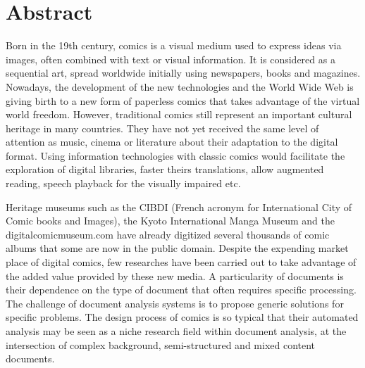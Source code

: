 \chapter*{Abstract}


Born in the 19th century, comics is a visual medium used to express ideas via images, often combined with text or visual information.
It is considered as a sequential art, spread worldwide initially using newspapers, books and magazines.
Nowadays, the development of the new technologies and the World Wide Web is giving birth to a new form of paperless comics that takes advantage of the virtual world freedom.
However, traditional comics still represent an important cultural heritage in many countries.
They have not yet received the same level of attention as music, cinema or literature about their adaptation to the digital format.
Using information technologies with classic comics would facilitate the exploration of digital libraries, faster theirs translations, allow augmented reading, speech playback for the visually impaired etc.

Heritage museums such as the CIBDI (French acronym for International City of Comic books and Images), the Kyoto International Manga Museum and the digitalcomicmuseum.com have already digitized several thousands of comic albums that some are now in the public domain.
Despite the expending market place of digital comics, few researches have been carried out to take advantage of the added value provided by these new media.
A particularity of documents is their dependence on the type of document that often requires specific processing.
The challenge of document analysis systems is to propose generic solutions for specific problems.
The design process of comics is so typical that their automated analysis may be seen as a niche research field within document analysis, at the intersection of complex background, semi-structured and mixed content documents.

